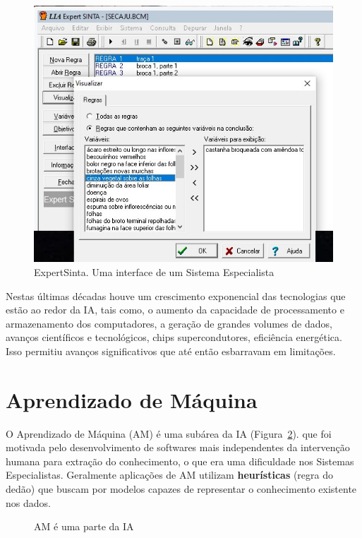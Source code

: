 \documentclass[a4paper,12pt]{book}
\begin{document}
\begin{figure}
	\centering
	\includegraphics[width=0.7\linewidth]{figuras/expert}
	\caption{ExpertSinta. Uma interface de um Sistema Especialista}
	\label{fig:expert}

\end{figure}

Nestas últimas décadas houve um crescimento exponencial das tecnologias que  estão ao redor da IA, tais como, o aumento da capacidade de processamento e armazenamento dos computadores, a geração de grandes volumes de dados, avanços científicos e tecnológicos, chips supercondutores, eficiência energética. Isso permitiu avanços significativos que até então esbarravam em limitações.

\section{Aprendizado de Máquina}

O Aprendizado de Máquina (AM) é uma subárea da IA (Figura~\ref{fig:iaam}). que foi motivada pelo desenvolvimento de softwares mais independentes da intervenção humana para extração do conhecimento, o que era uma dificuldade nos Sistemas Especialistas. Geralmente aplicações de AM utilizam \textbf{heurísticas} (regra do dedão) que buscam por modelos capazes de representar o conhecimento existente nos dados.


\begin{figure}
	\centering
	\caption{AM é uma parte da IA}
	\label{fig:iaam}
\end{figure}
\end{document}
